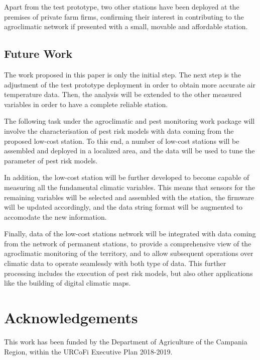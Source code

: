 \documentclass[conference]{IEEEtran}
\begin{document}
Apart from the test prototype, two other stations have been deployed at the premises of private farm firms, confirming their interest in contributing to the agroclimatic network if presented with a small, movable and affordable station.

\subsection{Future Work}
The work proposed in this paper is only the initial step. The next step is the adjustment of the test prototype deployment in order to obtain more accurate air temperature data. Then, the analysis will be extended to the other measured variables in order to have a complete reliable station.

The following task under the agroclimatic and pest monitoring work package will involve the characterisation of pest risk models with data coming from the proposed low-cost station. To this end, a number of low-cost stations will be assembled and deployed in a localized area, and the data will be used to tune the parameter of pest risk models.

In addition, the low-cost station will be further developed to become capable of measuring all the fundamental climatic variables. 
This means that sensors for the remaining variables will be selected and assembled with the station, the firmware will be updated accordingly, and the data string format will be augmented to accomodate the new information.

Finally, data of the low-cost stations network will be integrated with data coming from the network of permanent stations, to provide a comprehensive view of the agroclimatic monitoring of the territory, and to allow subsequent operations over climatic data to operate seamlessly with both type of data. This further processing includes the execution of pest risk models, but also other applications like the building of digital climatic maps.

\section*{Acknowledgements}
This work has been funded by the Department of Agriculture of the Campania Region, within the URCoFi Executive Plan 2018-2019.

\printbibliography
\end{document}
